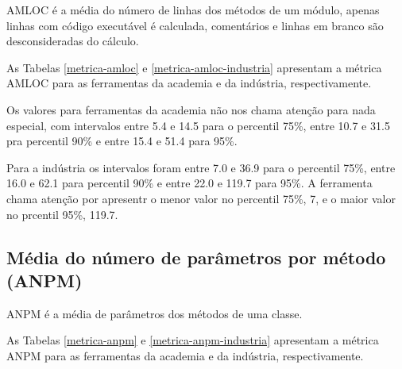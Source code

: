 AMLOC é a média do número de linhas dos métodos de um módulo, apenas linhas
com código executável é calculada, comentários e linhas em branco são
desconsideradas do cálculo.

As Tabelas \ref{metrica-amloc} e \ref{metrica-amloc-industria} apresentam a
métrica AMLOC para as ferramentas da academia e da indústria, respectivamente.


Os valores para ferramentas da academia não nos chama atenção para nada
especial, com intervalos entre 5.4 e 14.5 para o percentil 75\%, entre 10.7 e
31.5 pra percentil 90\% e entre 15.4 e 51.4 para 95\%.


Para a indústria os intervalos foram entre 7.0 e 36.9 para o percentil 75\%,
entre 16.0 e 62.1 para percentil 90\% e entre 22.0 e 119.7 para 95\%. A
ferramenta chama atenção por apresentr o menor valor no percentil 75\%, 7, e o
maior valor no prcentil 95\%, 119.7.

\subsection{Média do número de parâmetros por método (ANPM)}

ANPM é a média de parâmetros dos métodos de uma classe.

As Tabelas \ref{metrica-anpm} e \ref{metrica-anpm-industria} apresentam a
métrica ANPM para as ferramentas da academia e da indústria, respectivamente.

